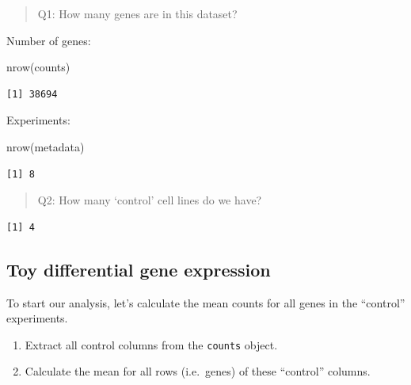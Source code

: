 \documentclass[
  letterpaper,
  DIV=11,
  numbers=noendperiod]{scrartcl}
\newenvironment{Shaded}{\begin{snugshade}}{\end{snugshade}}
\newcommand{\FunctionTok}[1]{\textcolor[rgb]{0.28,0.35,0.67}{#1}}
\newcommand{\NormalTok}[1]{\textcolor[rgb]{0.00,0.23,0.31}{#1}}
\newcommand{\SpecialCharTok}[1]{\textcolor[rgb]{0.37,0.37,0.37}{#1}}
\newcommand{\StringTok}[1]{\textcolor[rgb]{0.13,0.47,0.30}{#1}}
\providecommand{\tightlist}{%
  \setlength{\itemsep}{0pt}\setlength{\parskip}{0pt}}
\begin{document}
\begin{quote}
Q1: How many genes are in this dataset?
\end{quote}

Number of genes:

\begin{Shaded}
\begin{Highlighting}[]
\FunctionTok{nrow}\NormalTok{(counts)}
\end{Highlighting}
\end{Shaded}

\begin{verbatim}
[1] 38694
\end{verbatim}

Experiments:

\begin{Shaded}
\begin{Highlighting}[]
\FunctionTok{nrow}\NormalTok{(metadata)}
\end{Highlighting}
\end{Shaded}

\begin{verbatim}
[1] 8
\end{verbatim}

\begin{quote}
Q2: How many `control' cell lines do we have?
\end{quote}

\begin{Shaded}
\end{Shaded}

\begin{verbatim}
[1] 4
\end{verbatim}

\subsection{Toy differential gene
expression}\label{toy-differential-gene-expression}

To start our analysis, let's calculate the mean counts for all genes in
the ``control'' experiments.

\begin{enumerate}
\def\labelenumi{\arabic{enumi}.}
\tightlist
\item
  Extract all control columns from the \texttt{counts} object.
\item
  Calculate the mean for all rows (i.e.~genes) of these ``control''
  columns.
\end{enumerate}
\end{document}
